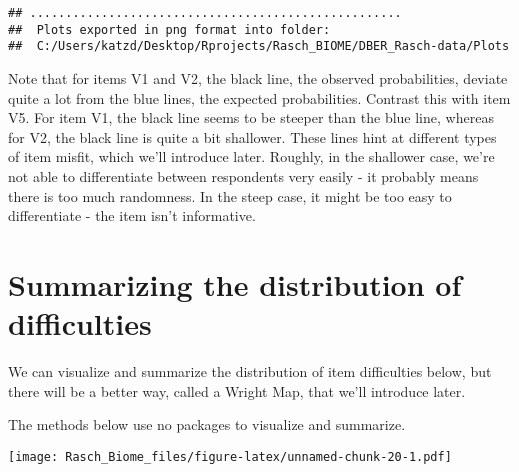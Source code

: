 \documentclass[
]{book}
\newenvironment{Shaded}{\begin{snugshade}}{\end{snugshade}}
\newcommand{\AttributeTok}[1]{\textcolor[rgb]{0.77,0.63,0.00}{#1}}
\newcommand{\CommentTok}[1]{\textcolor[rgb]{0.56,0.35,0.01}{\textit{#1}}}
\newcommand{\DecValTok}[1]{\textcolor[rgb]{0.00,0.00,0.81}{#1}}
\newcommand{\FunctionTok}[1]{\textcolor[rgb]{0.00,0.00,0.00}{#1}}
\newcommand{\NormalTok}[1]{#1}
\newcommand{\SpecialCharTok}[1]{\textcolor[rgb]{0.00,0.00,0.00}{#1}}
\newcommand{\StringTok}[1]{\textcolor[rgb]{0.31,0.60,0.02}{#1}}
\begin{document}
\begin{verbatim}
## ....................................................
##  Plots exported in png format into folder:
##  C:/Users/katzd/Desktop/Rprojects/Rasch_BIOME/DBER_Rasch-data/Plots
\end{verbatim}

Note that for items V1 and V2, the black line, the observed probabilities, deviate quite a lot from the blue lines, the expected probabilities. Contrast this with item V5. For item V1, the black line seems to be steeper than the blue line, whereas for V2, the black line is quite a bit shallower. These lines hint at different types of item misfit, which we'll introduce later. Roughly, in the shallower case, we're not able to differentiate between respondents very easily - it probably means there is too much randomness. In the steep case, it might be too easy to differentiate - the item isn't informative.

\hypertarget{summarizing-the-distribution-of-difficulties}{%
\section{Summarizing the distribution of difficulties}\label{summarizing-the-distribution-of-difficulties}}

We can visualize and summarize the distribution of item difficulties below, but there will be a better way, called a Wright Map, that we'll introduce later.

The methods below use no packages to visualize and summarize.

\begin{Shaded}
\end{Shaded}

\texttt{[image: Rasch\_Biome\_files/figure-latex/unnamed-chunk-20-1.pdf]}

\begin{Shaded}
\end{Shaded}
\end{document}

